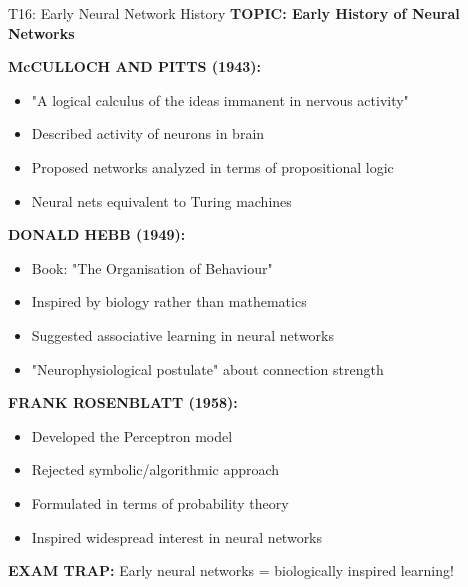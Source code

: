 \documentclass[8pt]{beamer}
\begin{document}
	\begin{frame}{T16: Early Neural Network History}
		\fontsize{6.5}{7.5}\selectfont
		\textbf{TOPIC: Early History of Neural Networks}
		
		\vspace{0.1cm}
		\textbf{McCULLOCH AND PITTS (1943):}
		\begin{itemize}
			\item "A logical calculus of the ideas immanent in nervous activity"
			\item Described activity of neurons in brain
			\item Proposed networks analyzed in terms of propositional logic
			\item Neural nets equivalent to Turing machines
		\end{itemize}
		
		\vspace{0.1cm}
		\textbf{DONALD HEBB (1949):}
		\begin{itemize}
			\item Book: "The Organisation of Behaviour"
			\item Inspired by biology rather than mathematics
			\item Suggested associative learning in neural networks
			\item "Neurophysiological postulate" about connection strength
		\end{itemize}
		
		\vspace{0.1cm}
		\textbf{FRANK ROSENBLATT (1958):}
		\begin{itemize}
			\item Developed the Perceptron model
			\item Rejected symbolic/algorithmic approach
			\item Formulated in terms of probability theory
			\item Inspired widespread interest in neural networks
		\end{itemize}
		
		\textcolor{myred}{\textbf{EXAM TRAP:}} Early neural networks = \textcolor{myblue}{biologically inspired learning}!
	\end{frame}
	
\end{document}
